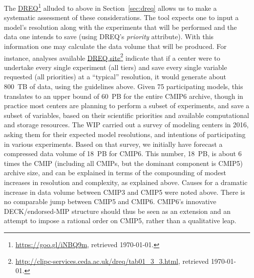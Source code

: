 \documentclass[gmd,manuscript]{copernicus}
\newcommand{\pllabel}[1]{\label{p-#1}\linelabel{l-#1}}
\newcommand{\urlref}[2] {\href{#1}{#2}\footnote{\url{#1}, retrieved \today.}}
\begin{document}
The \urlref{https://goo.gl/iNBQ9m}{DREQ} alluded to above in
Section~\ref{sec:dreq} allows us to make a systematic assessment of
these considerations. The tool expects one to input a model's
resolution along with the experiments that will be performed and the
data one intends to save (using DREQ's \emph{priority} attribute).
With this information
\pllabel{RC2-23}
one may calculate the data volume that will be produced. For instance,
analyses available
\urlref{http://clipc-services.ceda.ac.uk/dreq/tab01_3_3.html}{DREQ
  site} indicate that if a center were to undertake every single
experiment (all tiers) and save every single variable requested (all
priorities) at a ``typical'' resolution, it would generate about
800~TB of data, using the guidelines above. Given 75 participating
models, this translates to an upper bound of 60~PB for the entire
CMIP6 archive, though in practice most centers are planning to perform
a subset of experiments, and save a subset of variables, based on
their scientific priorities and available computational and storage
resources. The WIP carried out a survey of modeling centers in 2016,
asking them for their expected model resolutions, and intentions of
participating in various experiments. Based on that survey, we
initially have forecast a
\pllabel{RC1-27}
compressed data volume of 18~PB for CMIP6. This number, 18~PB, is
about 6 times the CMIP
\pllabel{RC1-28}
(including all CMIPs, but the dominant component is CMIP5) archive
size, and can be explained in terms of the compounding of modest
increases in resolution and complexity, as explained above.
\pllabel{RC1-29b}
Causes for a dramatic increase in data volume between CMIP3 and CMIP5
were noted above. There is no comparable jump between CMIP5 and CMIP6.
CMIP6's innovative DECK/endorsed-MIP structure should thus be seen as
an extension and an attempt to impose a rational order on CMIP5,
rather than a qualitative leap.
\end{document}
